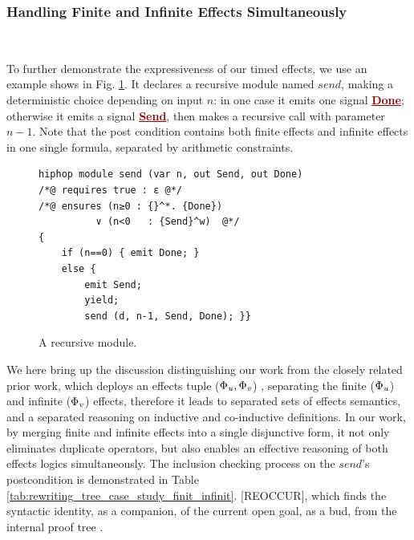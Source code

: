 \documentclass[acmsmall,review,anonymous]{acmart}\settopmatter{printfolios=true,printccs=false,printacmref=false}
\newcommand{\effect}{\textcolor{black}{\ensuremath{\mathrm{\Phi}}}}
\newcommand{\anyevent}[1]{{\textcolor{darkred}
{\underline{\textbf{\footnotesize #1}}}}}
\newcommand{\code}[1]{{\tt{\ensuremath{\m{#1}}}}}
\newcommand{\m}{\mathit}
\newcommand\figref[1]{Fig. \textcolor{black}{\ref{#1}}.}
\newcommand\tabref[1]{Table \textcolor{black}{\ref{#1}}.}
\begin{document}
\subsubsection{Handling Finite and Infinite Effects Simultaneously}~\\
\label{rec:finit_infinite}

      \vspace{-2mm}
To further demonstrate the expressiveness of our timed effects, we use an example shows in \figref{fig:case_study_finit_infinit}
It declares a recursive module named \code{send}, making a deterministic choice depending on input \code{n}: in one case it emits one  signal  \anyevent{Done}; otherwise it emits a signal 
\anyevent{Send}, then makes a recursive call with parameter \code{n{-}1}.  Note that the post condition contains both finite effects and infinite effects in one single formula, separated by arithmetic constraints. 




\begin{figure}
      \vspace{-2mm}
\begin{lstlisting}[columns=fullflexible]
hiphop module send (var n, out Send, out Done)
/*@ requires true : ε @*/
/*@ ensures	(n≥0 : {}^*. {Done}) 
          ∨ (n<0   : {Send}^w)  @*/
{
	if (n==0) { emit Done; }
	else {
		emit Send;
		yield;
		send (d, n-1, Send, Done); }}
\end{lstlisting}  
      \vspace{-1mm}
      \caption{A recursive  module.}\label{fig:case_study_finit_infinit}
         \vspace{-2mm}
\end{figure}




We here bring up the discussion distinguishing our work from the closely related prior work,  which deploys an effects tuple (\code{\effect_{u},\effect_{v}}) \cite{nanjo2018fixpoint},  separating the finite (\code{\effect_{u}}) and infinite (\code{\effect_{v}}) effects, therefore it leads to separated sets of effects semantics, and a separated reasoning on inductive and co-inductive definitions. 
In our work, by merging finite and infinite effects into a single disjunctive form, it not only eliminates duplicate operators, but also enables an effective reasoning of both effects logics simultaneously.  
The inclusion checking process on the \code{send}'s postcondition is demonstrated in \tabref{tab:rewriting_tree_case_study_finit_infinit} [REOCCUR], which finds the syntactic identity, as a companion, of the current open goal, as a bud, from the internal proof tree \cite{brotherston2005cyclic}. 
\end{document}
